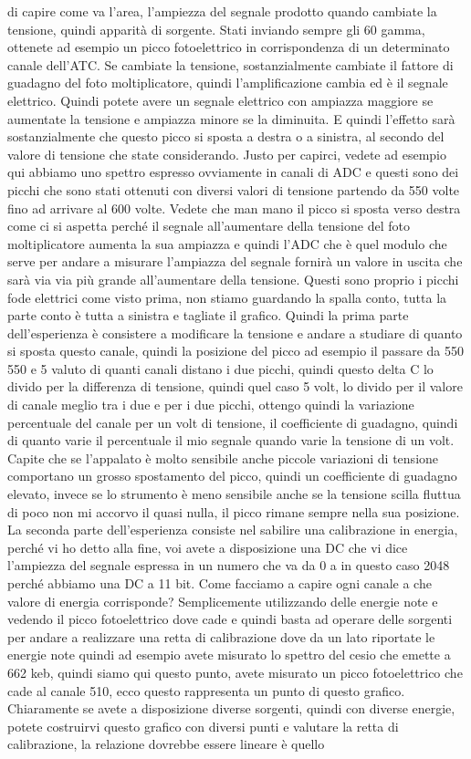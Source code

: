 di capire come va l'area, l'ampiezza del segnale prodotto quando cambiate la tensione, quindi apparità di sorgente. Stati inviando sempre gli 60 gamma, ottenete ad esempio un picco fotoelettrico in corrispondenza di un determinato canale dell'ATC. Se cambiate la tensione, sostanzialmente cambiate il fattore di guadagno del foto moltiplicatore, quindi l'amplificazione cambia ed è il segnale elettrico. Quindi potete avere un segnale elettrico con ampiazza maggiore se aumentate la tensione e ampiazza minore se la diminuita. E quindi l'effetto sarà sostanzialmente che questo picco si sposta a destra o a sinistra, al secondo del valore di tensione che state considerando. Justo per capirci, vedete ad esempio qui abbiamo uno spettro espresso ovviamente in canali di ADC e questi sono dei picchi che sono stati ottenuti con diversi valori di tensione partendo da 550 volte fino ad arrivare al 600 volte. Vedete che man mano il picco si sposta verso destra come ci si aspetta perché il segnale all'aumentare della tensione del foto moltiplicatore aumenta la sua ampiazza e quindi l'ADC che è quel modulo che serve per andare a misurare l'ampiazza del segnale fornirà un valore in uscita che sarà via via più grande all'aumentare della tensione. Questi sono proprio i picchi fode elettrici come visto prima, non stiamo guardando la spalla conto, tutta la parte conto è tutta a sinistra e tagliate il grafico. Quindi la prima parte dell'esperienza è consistere a modificare la tensione e andare a studiare di quanto si sposta questo canale, quindi la posizione del picco ad esempio il passare da 550 550 e 5 valuto di quanti canali distano i due picchi, quindi questo delta C lo divido per la differenza di tensione, quindi quel caso 5 volt, lo divido per il valore di canale meglio tra i due e per i due picchi, ottengo quindi la variazione percentuale del canale per un volt di tensione, il coefficiente di guadagno, quindi di quanto varie il percentuale il mio segnale quando varie la tensione di un volt. Capite che se l'appalato è molto sensibile anche piccole variazioni di tensione comportano un grosso spostamento del picco, quindi un coefficiente di guadagno elevato, invece se lo strumento è meno sensibile anche se la tensione scilla fluttua di poco non mi accorvo il quasi nulla, il picco rimane sempre nella sua posizione. La seconda parte dell'esperienza consiste nel sabilire una calibrazione in energia, perché vi ho detto alla fine, voi avete a disposizione una DC che vi dice l'ampiezza del segnale espressa in un numero che va da 0 a in questo caso 2048 perché abbiamo una DC a 11 bit. Come facciamo a capire ogni canale a che valore di energia corrisponde? Semplicemente utilizzando delle energie note e vedendo il picco fotoelettrico dove cade e quindi basta ad operare delle sorgenti per andare a realizzare una retta di calibrazione dove da un lato riportate le energie note quindi ad esempio avete misurato lo spettro del cesio che emette a 662 keb, quindi siamo qui questo punto, avete misurato un picco fotoelettrico che cade al canale 510, ecco questo rappresenta un punto di questo grafico. Chiaramente se avete a disposizione diverse sorgenti, quindi con diverse energie, potete costruirvi questo grafico con diversi punti e valutare la retta di calibrazione, la relazione dovrebbe essere lineare è quello 
